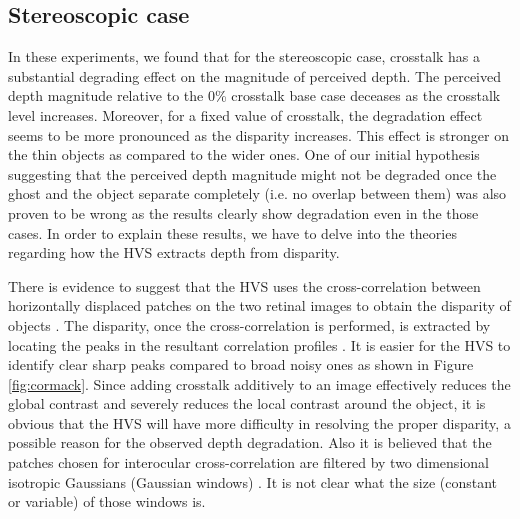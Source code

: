 \subsection{Stereoscopic case}
In these experiments, we found that for the stereoscopic case, crosstalk has a substantial degrading effect on the magnitude of perceived depth. The perceived depth magnitude relative to the 0\% crosstalk base case deceases as the crosstalk level increases. Moreover, for a fixed value of crosstalk, the degradation effect seems to be more pronounced as the disparity increases. This effect is stronger on the thin objects as compared to the wider ones. One of our initial hypothesis suggesting that the perceived depth magnitude might not be degraded once the ghost and the object separate completely (i.e. no overlap between them) was also proven to be wrong as the results clearly show degradation even in the those cases. In order to explain these results, we have to delve into the theories regarding how the HVS extracts depth from disparity.

There is evidence to suggest that the HVS uses the cross-correlation between horizontally displaced patches on the two retinal images to obtain the disparity of objects \cite{filippini2009limits}\cite{kane2014limits}. The disparity, once the cross-correlation is performed, is extracted by locating the peaks in the resultant correlation profiles \cite{cormack1991interocular}. It is easier for the HVS to identify clear sharp peaks compared to broad noisy ones as shown in Figure \ref{fig:cormack}. Since adding crosstalk additively to an image effectively reduces the global contrast and severely reduces the local contrast around the object, it is obvious that the HVS will have more difficulty in resolving the proper disparity, a possible reason for the observed depth degradation. Also it is believed that the patches chosen for interocular cross-correlation are filtered by two dimensional isotropic Gaussians (Gaussian windows) \cite{filippini2009limits}. It is not clear what the size (constant or variable) of those windows is.


